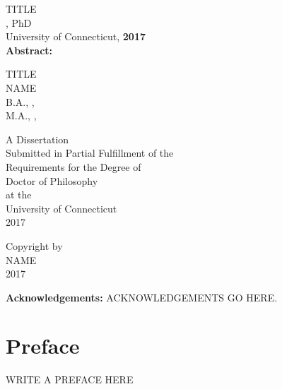 \documentclass[12pt]{report}
\begin{document}
\doublespacing
\thispagestyle{empty}

{\center TITLE\\ %
        , PhD\\ %
        University of Connecticut, \textbf{2017}\\ }
\vspace{1cm}
\textbf{Abstract: }  %

\newpage

{\center TITLE \\ %

        \vspace{1cm}
 NAME       \\ %

        \vspace{2cm}
        B.A., , \textbf{}\\ %
        M.A., , \textbf{} %

        \vspace{7cm}
        A Dissertation\\ 
        Submitted in Partial Fulfillment of the\\ 
        Requirements for the Degree of\\ 
        Doctor of Philosophy\\ 
        at the\\
        University of Connecticut\\
        2017

}
\newpage
{\center Copyright by\\ 
  NAME\\ %
\vfill 
2017


}

\newpage

\textbf{Acknowledgements: } ACKNOWLEDGEMENTS GO HERE.  


\newpage


\chapter*{Preface}
WRITE A PREFACE HERE
\end{document}
